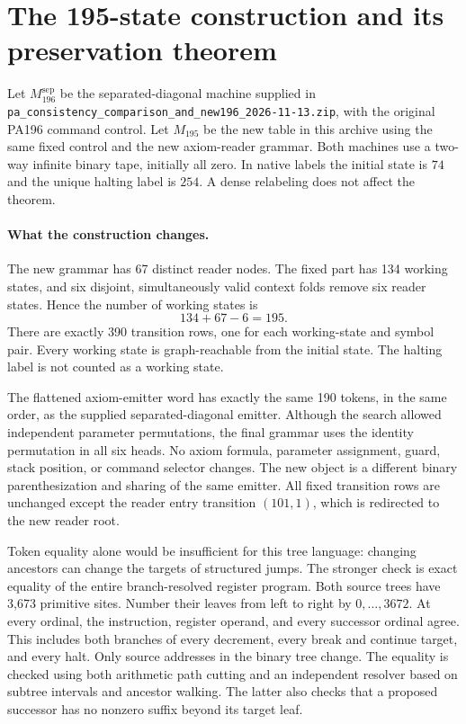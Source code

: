\section{The 195-state construction and its preservation theorem}
\label{sec:preservation195}

Let $M_{196}^{\mathrm{sep}}$ be the separated-diagonal machine supplied in
\nolinkurl{pa_consistency_comparison_and_new196_2026-11-13.zip},
with the original PA196 command control. Let $M_{195}$ be the new table
in this archive using the same fixed control and the new axiom-reader
grammar. Both machines use a two-way infinite binary tape, initially all
zero. In native labels the initial state is $74$ and the unique halting
label is $254$. A dense relabeling does not affect the theorem.

\paragraph{What the construction changes.}
The new grammar has 67 distinct reader nodes. The fixed part has 134
working states, and six disjoint, simultaneously valid context folds
remove six reader states. Hence the number of working states is
\[
 134+67-6=195.
\]
There are exactly 390 transition rows, one for each working-state and
symbol pair. Every working state is graph-reachable from the initial
state. The halting label is not counted as a working state.

The flattened axiom-emitter word has exactly the same 190 tokens, in
the same order, as the supplied separated-diagonal emitter. Although the
search allowed independent parameter permutations, the final grammar
uses the identity permutation in all six heads. No axiom formula,
parameter assignment, guard, stack position, or command selector changes.
The new object is a different binary parenthesization and sharing of the
same emitter. All fixed transition rows are unchanged except the reader
entry transition $(101,1)$, which is redirected to the new reader root.

Token equality alone would be insufficient for this tree language:
changing ancestors can change the targets of structured jumps. The
stronger check is exact equality of the entire branch-resolved register
program. Both source trees have 3,673 primitive sites. Number their leaves
from left to right by $0,\ldots,3672$. At every ordinal, the instruction,
register operand, and every successor ordinal agree. This includes both
branches of every decrement, every break and continue target, and every
halt. Only source addresses in the binary tree change. The equality is
checked using both arithmetic path cutting and an independent resolver
based on subtree intervals and ancestor walking. The latter also checks
that a proposed successor has no nonzero suffix beyond its target leaf.

